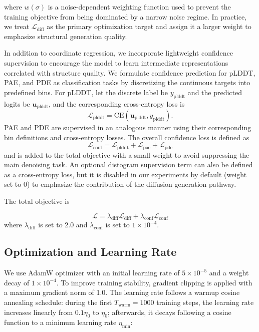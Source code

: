 where $w(\sigma)$ is a noise-dependent weighting function used to prevent the training objective from being dominated by a narrow noise regime. In practice, we treat $\mathcal{L}_{\mathrm{diff}}$ as the primary optimization target and assign it a larger weight to emphasize structural generation quality.

In addition to coordinate regression, we incorporate lightweight confidence supervision to encourage the model to learn intermediate representations correlated with structure quality. We formulate confidence prediction for pLDDT, PAE, and PDE as classification tasks by discretizing the continuous targets into predefined bins. For pLDDT, let the discrete label be $y_{\mathrm{plddt}}$ and the predicted logits be $\mathbf{u}_{\mathrm{plddt}}$, and the corresponding cross-entropy loss is
$$
\mathcal{L}_{\mathrm{plddt}}
=
\mathrm{CE}\left(\mathbf{u}_{\mathrm{plddt}}, y_{\mathrm{plddt}}\right).  
$$
PAE and PDE are supervised in an analogous manner using their corresponding bin definitions and cross-entropy losses. The overall confidence loss is defined as
$$
\mathcal{L}_{\mathrm{conf}}
=
\mathcal{L}_{\mathrm{plddt}} + \mathcal{L}_{\mathrm{pae}} + \mathcal{L}_{\mathrm{pde}} 
$$
and is added to the total objective with a small weight to avoid suppressing the main denoising task. An optional distogram supervision term can also be defined as a cross-entropy loss, but it is disabled in our experiments by default (weight set to 0) to emphasize the contribution of the diffusion generation pathway.

The total objective is

$$
\mathcal{L}
=
\lambda_{\mathrm{diff}}\mathcal{L}_{\mathrm{diff}}  
+  
\lambda_{\mathrm{conf}}\mathcal{L}_{\mathrm{conf}}
$$
where $\lambda_{\mathrm{diff}}$ is set to 2.0 and $\lambda_{\mathrm{conf}}$ is set to $1\times 10^{-4}$.

\subsection{Optimization and Learning Rate}

We use AdamW optimizer with an initial learning rate of $5\times 10^{-5}$ and a weight decay of $1\times 10^{-4}$. To improve training stability, gradient clipping is applied with a maximum gradient norm of 1.0. The learning rate follows a warmup cosine annealing schedule: during the first $T_{\mathrm{warm}}=1000$ training steps, the learning rate increases linearly from $0.1\eta_0$ to $\eta_0$; afterwards, it decays following a cosine function to a minimum learning rate $\eta_{\min}$:

